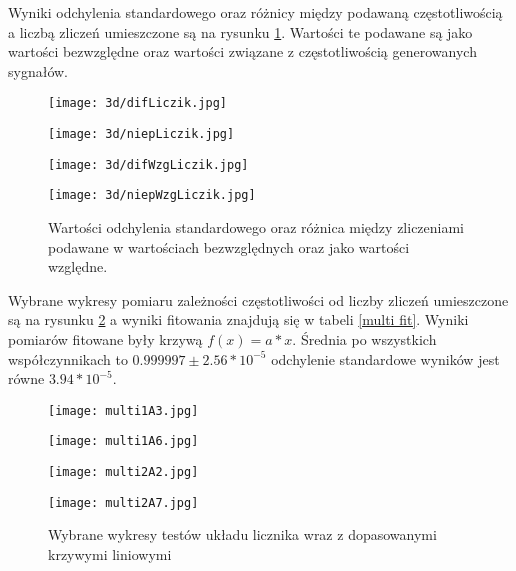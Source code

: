 Wyniki odchylenia standardowego oraz różnicy między podawaną częstotliwością a liczbą zliczeń umieszczone są na rysunku \ref{3d licznik}. Wartości te podawane są jako wartości bezwzględne oraz wartości związane z częstotliwością generowanych sygnałów.

\begin{figure}
        \centering
        \begin{multicols}{2}
                \texttt{[image: 3d/difLiczik.jpg]} \par                
                \texttt{[image: 3d/niepLiczik.jpg]} \par                
        \end{multicols} \hfill
        \begin{multicols}{2}
                \texttt{[image: 3d/difWzgLiczik.jpg]} \par                
                \texttt{[image: 3d/niepWzgLiczik.jpg]} \par                
        \end{multicols}
        \caption{Wartości odchylenia standardowego oraz różnica między zliczeniami podawane w wartościach bezwzględnych oraz jako wartości względne. }
        \label{3d licznik}
\end{figure}

Wybrane wykresy pomiaru zależności częstotliwości od liczby zliczeń umieszczone są na rysunku \ref{multi wyk} a wyniki fitowania znajdują się w tabeli \ref{multi fit}. Wyniki pomiarów fitowane były krzywą $f(x) = a*x$. 
Średnia po wszystkich współczynnikach to $0.999997 \pm 2.56*10^{-5}$
odchylenie standardowe wyników jest równe  $3.94 * 10^{-5}$.

\begin{figure}
        \centering
        \begin{multicols}{2}
                \texttt{[image: multi1A3.jpg]} \par
                \texttt{[image: multi1A6.jpg]} \par                
        \end{multicols} \hfill
        \begin{multicols}{2}
                \texttt{[image: multi2A2.jpg]} \par
                \texttt{[image: multi2A7.jpg]} \par                
        \end{multicols}
        \caption{Wybrane wykresy testów układu licznika wraz z dopasowanymi krzywymi liniowymi}
        \label{multi wyk}
\end{figure}


